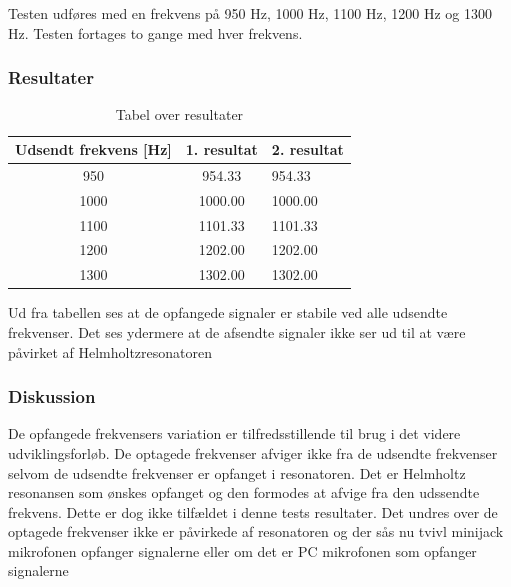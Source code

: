 			Testen udføres med en frekvens på 950 Hz, 1000 Hz, 1100 Hz, 1200 Hz og 1300 Hz. Testen fortages to gange med hver frekvens.  
			
			\subsubsection{Resultater}
			
			\begin{table}[]
				\centering
				\caption{Tabel over resultater}
				\label{bordtest5resultater}
				\begin{tabular}{lll}
					\multicolumn{1}{l|}{\textbf{Udsendt frekvens {[}Hz{]}}} & 	
					\multicolumn{1}{l|}{\textbf{1. resultat}} & \textbf{2. resultat} \\ \hline
					\multicolumn{1}{c|}{950}& 
					\multicolumn{1}{c|}{954.33}&954.33\\
					\multicolumn{1}{c|}{1000}& 
					\multicolumn{1}{c|}{1000.00}&1000.00\\
					\multicolumn{1}{c|}{1100}& 
					\multicolumn{1}{c|}{1101.33}&1101.33\\
					\multicolumn{1}{c|}{1200}& 
					\multicolumn{1}{c|}{1202.00}&1202.00\\
					\multicolumn{1}{c|}{1300}& 
					\multicolumn{1}{c|}{1302.00}&1302.00\\
                   
				\end{tabular}
			\end{table}
			
			Ud fra tabellen ses at de opfangede signaler er stabile ved alle udsendte frekvenser. Det ses ydermere at de afsendte signaler ikke ser ud til at være påvirket af Helmholtzresonatoren
				
			  
			\subsubsection{Diskussion}
			De opfangede frekvensers variation er tilfredsstillende til brug i det videre udviklingsforløb. De optagede frekvenser afviger ikke fra de udsendte frekvenser selvom de udsendte frekvenser er opfanget i resonatoren. Det er Helmholtz resonansen som ønskes opfanget og den formodes at afvige fra den udssendte frekvens. Dette er dog ikke tilfældet i denne tests resultater. Det undres over de optagede frekvenser ikke er påvirkede af resonatoren og der sås nu tvivl minijack mikrofonen opfanger signalerne eller om det er PC mikrofonen som opfanger signalerne
			
